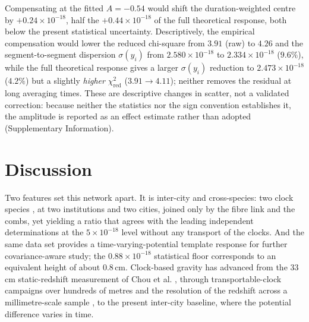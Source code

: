 \documentclass[11pt,a4paper]{article}
\newcommand{\e}[1]{\times 10^{#1}}
\begin{document}
Compensating at the fitted $A=-0.54$ would shift the duration-weighted
centre by $+0.24\e{-18}$, half the $+0.44\e{-18}$ of the full theoretical
response, both below the present statistical uncertainty. Descriptively,
the empirical compensation would lower the reduced chi-square from
$3.91$ (raw) to $4.26$ and the segment-to-segment dispersion
$\sigma(y_i)$ from $2.580\e{-18}$ to $2.334\e{-18}$
($9.6\%$), while the full theoretical response gives a larger
$\sigma(y_i)$ reduction to $2.473\e{-18}$ ($4.2\%$) but a slightly
\emph{higher} $\chi^{2}_{\mathrm{red}}$ ($3.91\to4.11$); neither removes the
residual at long averaging times. These are
descriptive changes in scatter, not a validated correction: because
neither the statistics nor the sign convention establishes it, the
amplitude is reported as an effect estimate rather than adopted
(Supplementary Information).



\section{Discussion}
\label{sec:caveats}

Two features set this network apart. It is inter-city and cross-species:
two clock species \citep{zhu2026yb, jia2026sr}, at two institutions and
two cities, joined only by the fibre link and the combs, yet yielding a
ratio that agrees with the leading independent determinations at the
$5\e{-18}$ level without any transport of the clocks. And the same data
set provides a time-varying-potential template response for further
covariance-aware study; the $0.88\e{-18}$ statistical floor corresponds to
an equivalent height of about $0.8$\,cm. Clock-based gravity has advanced
from the $33$\,cm static-redshift measurement of Chou et al.
\citep{chou2010redshift}, through transportable-clock campaigns over
hundreds of metres \citep{takamoto2020redshift, grotti2018geodesy} and the
resolution of the redshift across a millimetre-scale sample
\citep{bothwell2022redshift}, to the present inter-city baseline, where
the potential difference varies in time.
\end{document}
